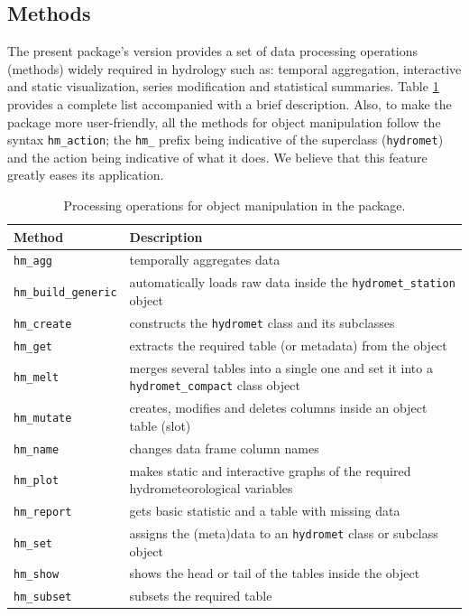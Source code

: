 \hypertarget{methods}{%
\subsection{Methods}\label{methods}}

The present package's version provides a set of data processing
operations (methods) widely required in hydrology such as: temporal
aggregation, interactive and static visualization, series modification and
statistical summaries. Table
\ref{tab:table-methods-static}
provides a complete list accompanied with a brief description. Also, to
make the package more user-friendly, all the methods for object
manipulation follow the syntax \texttt{hm\_action}; the \texttt{hm\_} prefix being
indicative of the superclass (\texttt{hydromet}) and the action being
indicative of what it does. We believe that this feature greatly eases
its application.

\begin{table}

\caption{\label{tab:table-methods-static}Processing operations for object manipulation in the  package.}
\centering
\fontsize{9}{11}\selectfont
\begin{tabular}[t]{>{}ll}
\toprule
\textbf{Method} & \textbf{Description}\\
\midrule
\texttt{hm\_agg} & temporally aggregates  data\\
\texttt{hm\_build\_generic} & automatically loads raw data inside the \texttt{hydromet\_station} object\\
\texttt{hm\_create} & constructs the \texttt{hydromet} class and its subclasses\\
\texttt{hm\_get} & extracts the required table (or metadata) from the object\\
\texttt{hm\_melt} & merges several tables into a single one and set it into a \texttt{hydromet\_compact} class object\\
\addlinespace
\texttt{hm\_mutate} & creates, modifies and deletes columns inside an object table (slot)\\
\texttt{hm\_name} & changes data frame column names\\
\texttt{hm\_plot} & makes static and interactive graphs of the required hydrometeorological variables\\
\texttt{hm\_report} & gets basic statistic and a table with missing data\\
\texttt{hm\_set} & assigns the (meta)data to an \texttt{hydromet} class or subclass object\\
\addlinespace
\texttt{hm\_show} & shows the head or tail of the tables inside the object\\
\texttt{hm\_subset} & subsets the required table\\
\bottomrule
\end{tabular}
\end{table}

